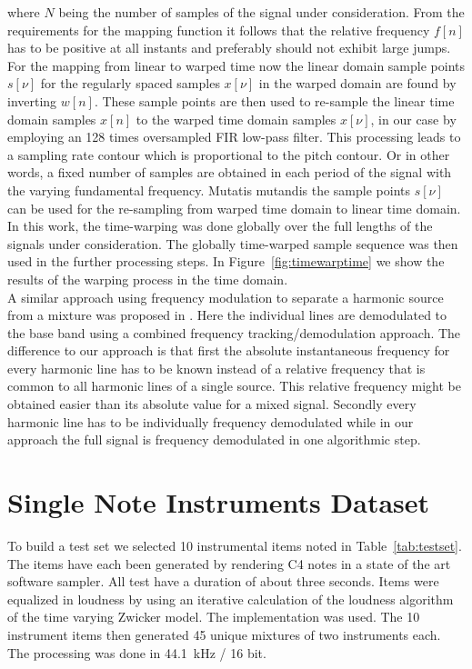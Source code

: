 where $N$ being the number of samples of the signal under consideration.
From the requirements for the mapping function it follows that the relative
frequency $f[n]$ has to be positive at all instants and preferably should not
exhibit large jumps.
For the mapping from linear to warped time now the linear domain sample points
$s[\nu]$ for the regularly spaced samples $x[\nu]$ in the warped domain are
found by inverting $w[n]$. These sample points are then used to re-sample the linear time
domain samples $x[n]$ to the warped time domain samples $x[\nu]$, in our case
by employing an 128 times oversampled FIR low-pass filter. This processing leads to a sampling rate contour which is proportional to the pitch contour. Or in other words, a fixed number of samples are obtained in each period of the signal with the varying fundamental frequency. Mutatis mutandis the sample points $s[\nu]$ can be used for the re-sampling from warped time domain to linear time domain. \\

In this work, the time-warping was done globally over the full lengths of the
signals under consideration. The globally time-warped sample sequence
was then used in the further processing steps. In Figure~\ref{fig:timewarptime} we show the results of the warping process in the time domain. \\

A similar approach using frequency modulation to separate a harmonic
source from a mixture was proposed in \cite{wang95}. Here the
individual lines are demodulated to the base band using a combined frequency
tracking/demodulation approach. The difference to our approach is that first
the absolute instantaneous frequency for every harmonic line has to be known
instead of a relative frequency that is common to all harmonic lines of a single
source. This relative frequency might be obtained easier than its
absolute value for a mixed signal. Secondly every harmonic line has to be individually frequency demodulated while in our approach the full signal is frequency demodulated in one algorithmic step.\\

\section{Single Note Instruments Dataset} %
\label{sub:test_set}

To build a test set we selected 10 instrumental items noted in Table~\ref{tab:testset}. The items have each been generated by rendering C4 notes in a state of the art software sampler. All test have a duration of about three seconds. Items were equalized in loudness by using an iterative calculation of the loudness algorithm of the time varying Zwicker model. The implementation \cite{genesis12} was used. The 10 instrument items then generated 45 unique mixtures of two instruments each. The processing was done in 44.1~kHz / 16 bit.

